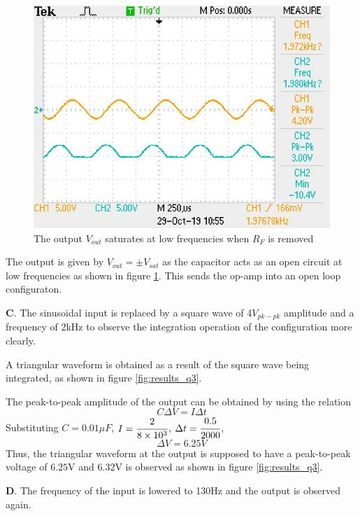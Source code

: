 \documentclass[12pt, titlepage]{article}
\theoremstyle{definition}
\begin{document}
    \begin{figure}[h]
      \centering
      \includegraphics[scale=0.5]{images/results_q2.jpeg}
      \caption{The output \color{cyan}$V_{out}$ \color{black}saturates at low frequencies when $R_F$ is removed}
      \label{fig:results_q2}
    \end{figure}

    The output is given by $V_{out}=\pm V_{sat}$ as the capacitor acts as an open circuit at low frequencies as shown in figure \ref{fig:results_q2}. This sends the op-amp into an open loop configuraton.

    \textbf{C}. The sinusoidal input is replaced by a square wave of 4$V_{pk-pk}$ amplitude and a frequency of 2kHz to observe the integration operation of the configuration more clearly.

    A triangular waveform is obtained as a result of the square wave being integrated, as shown in figure \ref{fig:results_q3}.

    The peak-to-peak amplitude of the output can be obtained by using the relation
    $$ C\Delta V = I\Delta t$$
    Substituting $C=0.01\mu F$, $I=\cfrac{2}{8\times 10^3}$, $\Delta t = \cfrac{0.5}{2000}$,
    $$ \Delta V = 6.25 V$$
    Thus, the triangular waveform at the output is supposed to have a peak-to-peak voltage of $6.25$V and $6.32$V is observed as shown in figure \ref{fig:results_q3}.

    \textbf{D}. The frequency of the input is lowered to 130Hz and the output is observed again.
\end{document}
